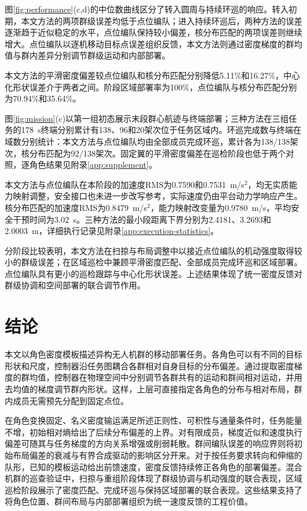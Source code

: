 \documentclass[UTF8,a4paper,11pt,fontset=none]{ctexart}
\begin{document}
图\ref{fig:performance}(c,d)的中位数曲线区分了转入圆周与持续环巡的响应。转入初期，本文方法的两项群级误差均低于点位编队；进入持续环巡后，两种方法的误差逐渐趋于近似稳定的水平，点位编队保持较小偏差，核分布匹配的两项误差则继续增大。点位编队以逐机移动目标点误差组织反馈，本文方法则通过密度梯度的群均值与群内差异分别调节群级运动和内部部署。

本文方法的平滑密度偏差较点位编队和核分布匹配分别降低5.11\%和16.27\%，中心化形状误差介于两者之间。阶段区域部署率为100\%，点位编队与核分布匹配分别为70.94\%和35.64\%。

\begin{samepage}
图\ref{fig:mission}(c)以第一组初态展示末段群心航迹与终端部署；三种方法在三组任务的178~s终端分别累计有138、96和20架次位于任务区域内。环巡完成数与终端在域数分别统计：本文方法与点位编队均由全部成员完成环巡，累计各为138/138架次，核分布匹配为92/138架次。固定翼的平滑密度偏差在巡检阶段也低于两个对照，逐角色结果见附录\ref{app:supplement}。
\end{samepage}

本文方法与点位编队在本阶段的加速度RMS为0.7590和0.7531~m/s$^2$，均无实质能力映射调整，安全接口也未进一步改写参考，实际速度仍由平台动力学响应产生。核分布匹配的加速度RMS为0.8479~m/s$^2$，能力映射改变量为0.9780~m/s，平均安全干预时间为3.02~s。三种方法的最小段距离下界分别为2.4181、3.2693和2.0003~m，详细执行记录见附录\ref{app:execution-statistics}。
\FloatBarrier

分阶段比较表明，本文方法在扫掠与布局调整中以接近点位编队的机动强度取得较小的群级误差；在区域巡检中兼顾平滑密度匹配、全部成员完成环巡和区域部署。点位编队具有更小的巡检跟踪与中心化形状误差。上述结果体现了统一密度反馈对群级协调和空间部署的联合调节作用。

\section{结论}
本文以角色密度模板描述异构无人机群的移动部署任务。各角色可以有不同的目标形状和尺度，控制器沿任务图耦合各群相对自身目标的分布偏差。通过提取密度梯度的群均值，控制器在物理空间中分别调节各群共有的运动和群间相对运动，并用去均值的梯度调节群内形状。这样，上层可直接指定各角色的分布与相对布局，群内成员无需预先分配到固定点位。

在角色变换固定、名义密度输运满足所述正则性、可积性与通量条件时，任务能量不增，初始相对熵给出了后续分布偏差的上界。对有限成员，梯度近似和速度执行偏差可随其与任务梯度的方向关系增强或削弱耗散。群间编队误差的响应界则将初始布局偏差的衰减与有界合成驱动的影响区分开来。对于按任务要求转向和伸缩的队形，已知的模板运动给出前馈速度，密度反馈持续修正各角色的部署偏差。混合机群的巡查验证中，扫掠与重组阶段体现了群级协调与机动强度的联合表现，区域巡检阶段展示了密度匹配、完成环巡与保持区域部署的联合表现。这些结果支持了将角色位置、群间布局与内部部署组织为统一速度反馈的工程价值。
\end{document}
